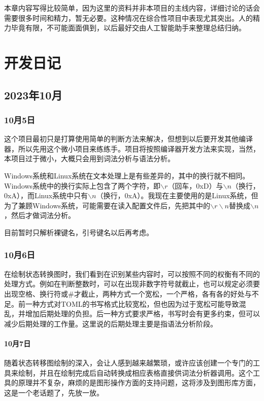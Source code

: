本章内容写得比较简单，因为这里的资料并非本项目的主线内容，详细讨论的话会需要很多时间和精力，暂无必要。这种情况在综合性项目中表现尤其突出。人的精力毕竟有限，不可能面面俱到，以后最好交由人工智能助手来整理总结归纳。


\chapter{开发日记}


\section{2023年10月}


\subsection{10月5日}
这个项目最初只是打算使用简单的判断方法来解决，但想到以后要开发其他编译器，所以先用这个微小项目来练练手。项目将按照编译器开发方法来实现，当然，本项目过于微小，大概只会用到词法分析与语法分析。

Windows系统和Linux系统在文本处理上是有些差异的，其中的换行就不相同。Windows系统中的换行实际上包含了两个字符，即$\backslash r$（回车，0xD）与$\backslash n$（换行，0xA），而Linux系统中只有$\backslash n$（换行，0xA）。我现在主要使用的是Linux系统，但为了兼顾Windows系统，可能需要在读入配置文件后，先把其中的$\backslash r\backslash n$替换成$\backslash n$，然后才做词法分析。

目前暂时只解析裸键名，引号键名以后再考虑。


\subsection{10月6日}
在绘制状态转换图时，我们看到在识别某些内容时，可以按照不同的权衡有不同的处理方式。例如在判断整数时，可以在出现非数字符号就截止，也可以规定必须要出现空格、换行符或\#才截止，两种方式一个宽松，一个严格，各有各的好处与不足。前一种方式对TOML的书写格式比较宽松，但也因为过于宽松可能导致混乱，并增加后期处理的负担。后一种方式要求严格，书写时会有更多约束，但可以减少后期处理的工作量。这里说的后期处理主要是指语法分析阶段。


\subsubsection{10月7日}
随着状态转移图绘制的深入，会让人感到越来越繁琐，或许应该创建一个专门的工具来绘制，并且在绘制完成后自动转换成相应表格直接供词法分析器调用。这个工具的原理并不复杂，麻烦的是图形操作方面的支持问题，这将涉及到图形库方面，这是一个老话题了，先放一放。


